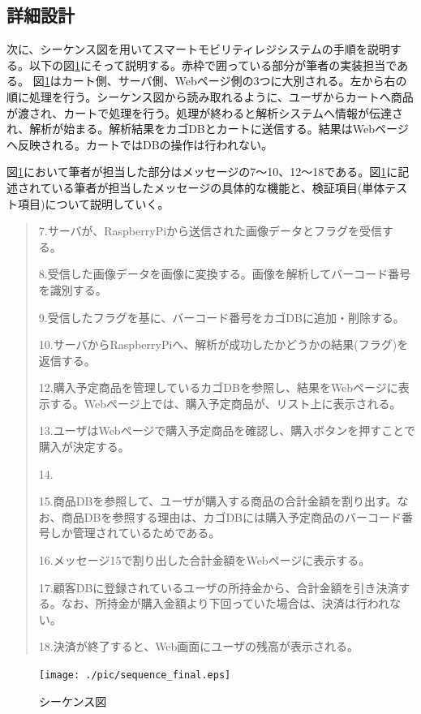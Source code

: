 \subsection*{詳細設計}
次に、シーケンス図を用いてスマートモビリティレジシステムの手順を説明する。以下の図\ref{sequence}にそって説明する。赤枠で囲っている部分が筆者の実装担当である。
図\ref{sequence}はカート側、サーバ側、Webページ側の3つに大別される。左から右の順に処理を行う。シーケンス図から読み取れるように、ユーザからカートへ商品が渡され、カートで処理を行う。処理が終わると解析システムへ情報が伝達され、解析が始まる。解析結果をカゴDBとカートに送信する。結果はWebページへ反映される。カートではDBの操作は行われない。

図\ref{sequence}において筆者が担当した部分はメッセージの7～10、12～18である。図\ref{sequence}に記述されている筆者が担当したメッセージの具体的な機能と、検証項目(単体テスト項目)について説明していく。


\begin{quote}

7.サーバが、RaspberryPiから送信された画像データとフラグを受信する。

8.受信した画像データを画像に変換する。画像を解析してバーコード番号を識別する。

9.受信したフラグを基に、バーコード番号をカゴDBに追加・削除する。

10.サーバからRaspberryPiへ、解析が成功したかどうかの結果(フラグ)を返信する。

12.購入予定商品を管理しているカゴDBを参照し、結果をWebページに表示する。Webページ上では、購入予定商品が、リスト上に表示される。

13.ユーザはWebページで購入予定商品を確認し、購入ボタンを押すことで購入が決定する。

14.

15.商品DBを参照して、ユーザが購入する商品の合計金額を割り出す。なお、商品DBを参照する理由は、カゴDBには購入予定商品のバーコード番号しか管理されているためである。

16.メッセージ15で割り出した合計金額をWebページに表示する。

17.顧客DBに登録されているユーザの所持金から、合計金額を引き決済する。なお、所持金が購入金額より下回っていた場合は、決済は行われない。

18.決済が終了すると、Web画面にユーザの残高が表示される。
\end{quote}

\begin{figure}[htbp]
\centering
\texttt{[image: ./pic/sequence\_final.eps]}
\caption{シーケンス図}
\label{sequence}
\end{figure}

